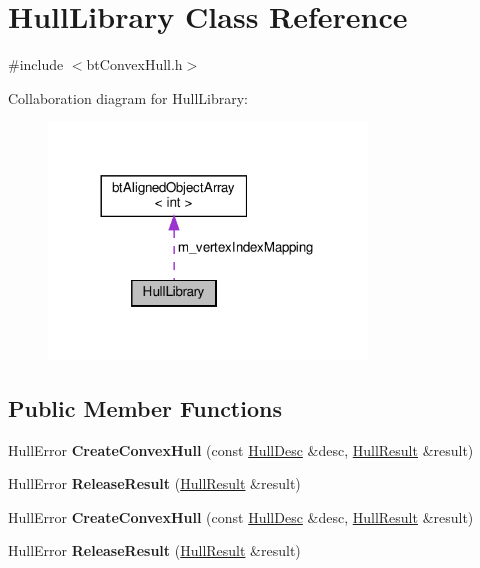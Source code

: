 \hypertarget{classHullLibrary}{}\section{Hull\+Library Class Reference}
\label{classHullLibrary}


{\ttfamily \#include $<$bt\+Convex\+Hull.\+h$>$}



Collaboration diagram for Hull\+Library\+:
\nopagebreak
\begin{figure}[H]
\begin{center}
\leavevmode
\includegraphics[width=240pt]{classHullLibrary__coll__graph}
\end{center}
\end{figure}
\subsection*{Public Member Functions}
\begin{DoxyCompactItemize}
\item 
\mbox{\label{classHullLibrary_a28e5dc544a9d0f326f5b9e02dac656f0}} 
Hull\+Error {\bfseries Create\+Convex\+Hull} (const \hyperlink{classHullDesc}{Hull\+Desc} \&desc, \hyperlink{classHullResult}{Hull\+Result} \&result)
\item 
\mbox{\label{classHullLibrary_a1694479ac11e270c9f8f13164c0f6dcf}} 
Hull\+Error {\bfseries Release\+Result} (\hyperlink{classHullResult}{Hull\+Result} \&result)
\item 
\mbox{\label{classHullLibrary_a28e5dc544a9d0f326f5b9e02dac656f0}} 
Hull\+Error {\bfseries Create\+Convex\+Hull} (const \hyperlink{classHullDesc}{Hull\+Desc} \&desc, \hyperlink{classHullResult}{Hull\+Result} \&result)
\item 
\mbox{\label{classHullLibrary_a1694479ac11e270c9f8f13164c0f6dcf}} 
Hull\+Error {\bfseries Release\+Result} (\hyperlink{classHullResult}{Hull\+Result} \&result)
\end{DoxyCompactItemize}
